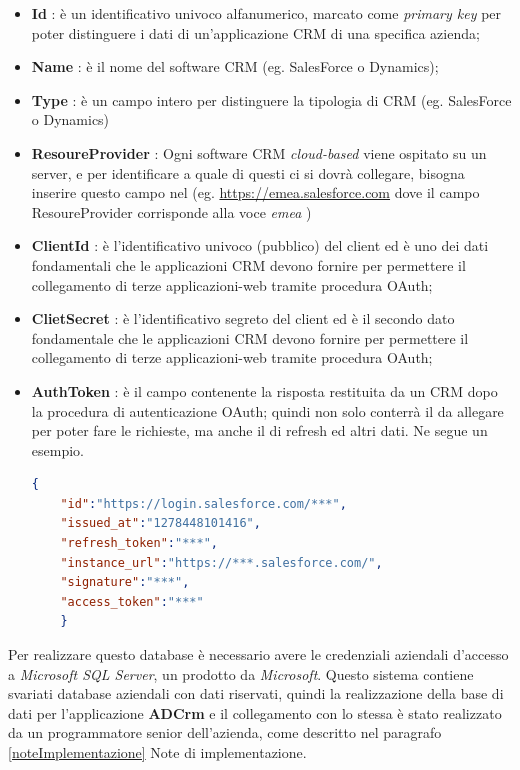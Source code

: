 \begin{itemize}
	\item \textbf{Id} : è un identificativo univoco alfanumerico, marcato come \textit{primary key} per poter distinguere i dati di  un'applicazione \gls{CRM} di una specifica azienda;
	\item \textbf{Name} : è il nome del software \gls{CRM} (eg. SalesForce o Dynamics);
	\item \textbf{Type} : è un campo intero per distinguere la tipologia di \gls{CRM} (eg. SalesForce o Dynamics)  
	\item \textbf{ResoureProvider} :
	Ogni software \gls{CRM} \textit{cloud-based} viene ospitato su un server, e per identificare a quale di questi ci si dovrà collegare, bisogna inserire questo campo nel  (eg. \url{https://emea.salesforce.com} dove il campo ResoureProvider corrisponde alla voce \textit{emea} )
	\item \textbf{ClientId} : è l’identificativo univoco (pubblico) del client ed è uno dei dati fondamentali che le applicazioni \gls{CRM} devono fornire per permettere il collegamento di terze applicazioni-web tramite procedura OAuth;
	\item \textbf{ClietSecret} :  è l’identificativo segreto del client ed è il secondo dato fondamentale che le applicazioni \gls{CRM} devono fornire per permettere il collegamento di terze applicazioni-web tramite procedura OAuth;
	\item \textbf{AuthToken} : è il campo contenente la risposta  restituita da un \gls{CRM} dopo la procedura di autenticazione OAuth; quindi non solo conterrà il  da allegare per poter fare le richieste, ma anche il  di refresh ed altri dati. Ne segue un esempio.
	
	
	\begin{lstlisting}[language=json,firstnumber=1]
	{
	"id":"https://login.salesforce.com/***",
	"issued_at":"1278448101416",
	"refresh_token":"***",
	"instance_url":"https://***.salesforce.com/",
	"signature":"***",
	"access_token":"***"
	}
	\end{lstlisting}
	
\end{itemize}

Per realizzare questo database  è necessario avere le credenziali aziendali d'accesso a \textit{Microsoft SQL Server}, un \textit{} prodotto da \textit{Microsoft}. Questo sistema contiene svariati database aziendali con dati riservati, quindi la realizzazione della base di dati per l'applicazione \textbf{ADCrm} e il collegamento con lo stessa è stato realizzato da un programmatore senior dell'azienda, come descritto nel paragrafo \ref{noteImplementazione} Note di implementazione. 

